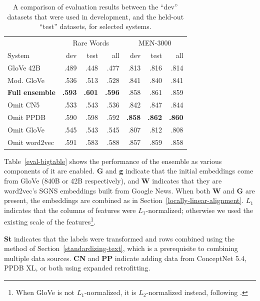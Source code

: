 \documentclass[11pt,letterpaper]{article}
\begin{document}
\begin{table}[t]
\footnotesize
\centering
\begin{tabular}{l|rrr|rrr}
\toprule
                   & \multicolumn{3}{|c|}{Rare Words} & \multicolumn{3}{|c}{MEN-3000} \\
System             &       dev &     test &      all &      dev &     test &      all \\
\midrule
GloVe 42B          &      .489 &     .448 &     .477 &     .813 &     .816 &     .814 \\
Mod. GloVe         &      .536 &     .513 &     .528 &     .841 &     .840 &     .841 \\
\bf Full ensemble  & \bf  .593 & \bf .601 & \bf .596 &     .858 &     .861 &     .859 \\
Omit CN5           &      .533 &     .543 &     .536 &     .842 &     .847 &     .844 \\
Omit PPDB          &      .590 &     .598 &     .592 & \bf .858 & \bf .862 & \bf .860 \\
Omit GloVe         &      .545 &     .543 &     .545 &     .807 &     .812 &     .808 \\
Omit word2vec      &      .591 &     .583 &     .588 &     .857 &     .859 &     .858 \\
\bottomrule
\end{tabular}

\caption{
    A comparison of evaluation results between the ``dev'' datasets that were
    used in development, and the held-out ``test'' datasets, for selected systems.
}
\label{eval-dev-test}
\end{table}


Table~\ref{eval-bigtable} shows the performance of the ensemble as various
components of it are enabled. {\bf G} and {\bf g} indicate that the initial
embeddings come from GloVe (840B or 42B respectively), and {\bf W} indicates
that they are word2vec's SGNS embeddings built from Google News. When both
{\bf W} and {\bf G} are present, the embeddings are combined as in
Section~\ref{locally-linear-alignment}. $L_1$ indicates that the columns of
features were $L_1$-normalized; otherwise we used the existing scale of the
features\footnote{
    When GloVe is not $L_1$-normalized, it is $L_2$-normalized instead,
    following .
}.

{\bf St} indicates that the labels were transformed and rows combined using the
method of Section~\ref{standardizing-text}, which is a prerequisite to combining
multiple data sources. {\bf CN} and {\bf PP} indicate adding data from
ConceptNet 5.4, PPDB XL, or both using expanded retrofitting.
\end{document}

